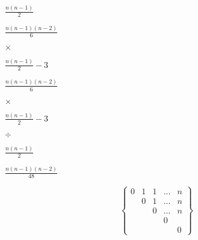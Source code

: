 \documentclass[10pt]{book}
\begin{document}
\begin{mdSnippets}
\begin{mdInlineSnippet}
$\frac{n(n-1)}{2}$\end{mdInlineSnippet}%
\begin{mdInlineSnippet}%
$ \frac{n( n - 1 )( n - 2 )}{6}$\end{mdInlineSnippet}%
\begin{mdInlineSnippet}[19af21bb9b4b023be42204a69025e8bd]%
$ \times $\end{mdInlineSnippet}%
\begin{mdInlineSnippet}[2c656429ad279476c9231d8b7501b659]%
$\frac{n(n-1)}{2} -3$\end{mdInlineSnippet}%
\begin{mdInlineSnippet}%
$ \frac{n( n - 1 )( n - 2 )}{6}$\end{mdInlineSnippet}%
\begin{mdInlineSnippet}[19af21bb9b4b023be42204a69025e8bd]%
$ \times $\end{mdInlineSnippet}%
\begin{mdInlineSnippet}[2c656429ad279476c9231d8b7501b659]%
$\frac{n(n-1)}{2} -3$\end{mdInlineSnippet}%
\begin{mdInlineSnippet}[a51c03c81b39860a4bf930afafaabaad]%
$ \div $\end{mdInlineSnippet}%
\begin{mdInlineSnippet}%
$\frac{n(n-1)}{2}$\end{mdInlineSnippet}%
\begin{mdInlineSnippet}[f9d27f76c022611181620b242288ec33]%
$\frac{n( n - 1 )( n - 2) }{48}$\end{mdInlineSnippet}%
\begin{mdDisplaySnippet}[3d02dd628fac4cc3d9265b72db68ee75]%
\[ \left\{
 \begin{matrix}
   0 & 1 & 1 & ... & n\\
     & 0 & 1 & ... & n\\
     &   & 0 & ... & n\\
     &   &   & 0 \\
     &   &   &     & 0
  \end{matrix}
  \right\}
\]%
\end{mdDisplaySnippet}%
\begin{mdInlineSnippet}[60c13e05d3ec8c10b8564eae7023d9db]%

\end{mdInlineSnippet}
\end{mdSnippets}
\end{document}
